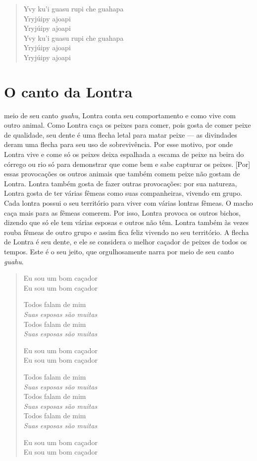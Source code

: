 \begin{verse}
Yvy ku'i guasu rupi che guahapa\\
Yryjúipy ajoapi\\
Yryjúipy ajoapi\\

Yvy ku'i guasu rupi che guahapa\\
Yryjúipy ajoapi\\
Yryjúipy ajoapi
\end{verse}

\chapter{O canto da Lontra}

 meio de seu canto \textit{guahu}, Lontra conta seu comportamento e
como vive com outro animal. Como Lontra caça os peixes para comer, pois
gosta de comer peixe de qualidade, seu dente é uma flecha letal para
matar peixe --- as divindades deram uma flecha para seu uso de
sobrevivência. Por esse motivo, por onde Lontra vive e come só os peixes
deixa espalhada a escama de peixe na beira do córrego ou rio só para
demonstrar que come bem e sabe capturar os peixes. {[}Por{]} essas
provocações os outros animais que também comem peixe não gostam de
Lontra. Lontra também gosta de fazer outras provocações: por sua
natureza, Lontra gosta de ter várias fêmeas como suas companheiras,
vivendo em grupo. Cada lontra possui o seu território para viver com
várias lontras fêmeas. O macho caça mais para as fêmeas comerem. Por
isso, Lontra provoca os outros bichos, dizendo que só ele tem várias
esposas e outros não têm. Lontra também às vezes rouba fêmeas de outro
grupo e assim fica feliz vivendo no seu território. A flecha de Lontra é
seu dente, e ele se considera o melhor caçador de peixes de todos os
tempos. Este é o seu jeito, que orgulhosamente narra por meio de seu
canto \textit{guahu}.

\begin{verse}
Eu sou um bom caçador\\
Eu sou um bom caçador

Todos falam de mim\\
\textit{Suas esposas são muitas}\\
Todos falam de mim\\
\textit{Suas esposas são muitas}

\pagebreak
Eu sou um bom caçador\\
Eu sou um bom caçador

Todos falam de mim\\
\textit{Suas esposas são muitas}\\
Todos falam de mim\\
\textit{Suas esposas são muitas}\\
Todos falam de mim\\
\textit{Suas esposas são muitas}

Eu sou um bom caçador\\
Eu sou um bom caçador
\end{verse}

